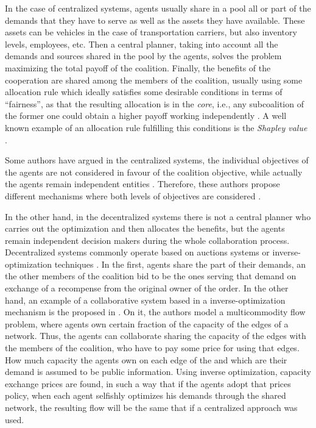 \documentclass[review]{elsarticle}
\begin{document}
In the case of centralized systems, agents usually share in a pool all or
part of the demands that they have to serve as well as the assets they have
available. These assets can be vehicles in the case of transportation carriers,
but also inventory levels, employees, etc. Then a central planner, taking into
account all the demands and sources shared in the pool by the agents, solves the
problem maximizing the total payoff of the coalition. Finally, the benefits of
the cooperation are shared among the members of the coalition, usually using
some allocation rule which ideally satisfies some desirable conditions in
terms of ``fairness'', as that the resulting allocation is in the \emph{core},
i.e., any subcoalition of the former one could obtain a higher payoff working
independently \cite{GONZALEZ2010}. A well known example of an allocation rule
fulfilling this conditions is the \emph{Shapley value} \cite{SHAPLEY1952}.

Some authors have argued in the centralized systems, the individual objectives
of the agents are not considered in favour of the coalition objective, while
actually the agents remain independent entities \cite{DEFRYN2018891}. Therefore,
these authors propose different mechanisms where both levels of objectives are
considered \cite{DEFRYN20191} \cite{VANOVERMEIRE2014125}.

In the other hand, in the decentralized systems there is not a central planner
who carries out the optimization and then allocates the benefits, but the agents
remain independent decision makers during the whole collaboration process.
Decentralized systems commonly operate based on auctions systems or
inverse-optimization techniques \cite{XIAOZHOU2013}. In the first, agents share
the part of their demands, an the other members of the coalition bid to be the
ones serving that demand on exchange of a recompense from the original owner of
the order. In the other hand, an example of a collaborative system based in a
inverse-optimization mechanism is the proposed in \cite{AGARWAL2008520}. On it,
the authors model a multicommodity flow problem, where agents own certain
fraction of the capacity of the edges of a network. Thus, the agents can
collaborate sharing the capacity of the edges with the members of the coalition,
who have to pay some price for using that edges. How much capacity the agents
own on each edge of the and which are their demand is assumed to be public
information. Using inverse optimization, capacity exchange prices are
found, in such a way that if the agents adopt that prices policy, when each
agent selfishly optimizes his demands through the shared network, the resulting
flow will be the same that if a centralized approach was used. 
\end{document}
